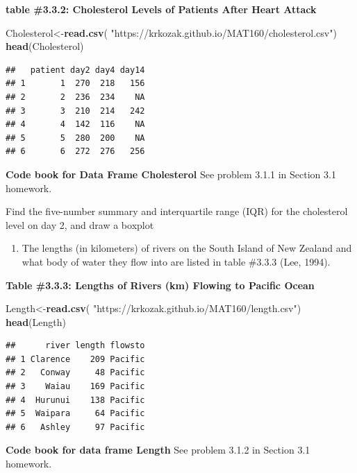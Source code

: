 \documentclass[
]{book}
\newenvironment{Shaded}{\begin{snugshade}}{\end{snugshade}}
\newcommand{\KeywordTok}[1]{\textcolor[rgb]{0.13,0.29,0.53}{\textbf{#1}}}
\newcommand{\NormalTok}[1]{#1}
\newcommand{\StringTok}[1]{\textcolor[rgb]{0.31,0.60,0.02}{#1}}
\providecommand{\tightlist}{%
  \setlength{\itemsep}{0pt}\setlength{\parskip}{0pt}}
\begin{document}
\textbf{table \#3.3.2: Cholesterol Levels of Patients After Heart Attack}

\begin{Shaded}
\begin{Highlighting}[]
\NormalTok{Cholesterol<-}\KeywordTok{read.csv}\NormalTok{(}
  \StringTok{"https://krkozak.github.io/MAT160/cholesterol.csv"}\NormalTok{)}
\KeywordTok{head}\NormalTok{(Cholesterol)}
\end{Highlighting}
\end{Shaded}

\begin{verbatim}
##   patient day2 day4 day14
## 1       1  270  218   156
## 2       2  236  234    NA
## 3       3  210  214   242
## 4       4  142  116    NA
## 5       5  280  200    NA
## 6       6  272  276   256
\end{verbatim}

\textbf{Code book for Data Frame Cholesterol} See problem 3.1.1 in Section 3.1 homework.

Find the five-number summary and interquartile range (IQR) for the cholesterol level on day 2, and draw a boxplot

\begin{enumerate}
\def\labelenumi{\arabic{enumi}.}
\setcounter{enumi}{5}
\tightlist
\item
  The lengths (in kilometers) of rivers on the South Island of New Zealand and what body of water they flow into are listed in table \#3.3.3 (Lee, 1994).
\end{enumerate}

\textbf{Table \#3.3.3: Lengths of Rivers (km) Flowing to Pacific Ocean}

\begin{Shaded}
\begin{Highlighting}[]
\NormalTok{Length<-}\KeywordTok{read.csv}\NormalTok{(}
  \StringTok{"https://krkozak.github.io/MAT160/length.csv"}\NormalTok{)}
\KeywordTok{head}\NormalTok{(Length)}
\end{Highlighting}
\end{Shaded}

\begin{verbatim}
##      river length flowsto
## 1 Clarence    209 Pacific
## 2   Conway     48 Pacific
## 3    Waiau    169 Pacific
## 4  Hurunui    138 Pacific
## 5  Waipara     64 Pacific
## 6   Ashley     97 Pacific
\end{verbatim}

\textbf{Code book for data frame Length} See problem 3.1.2 in Section 3.1 homework.
\end{document}

